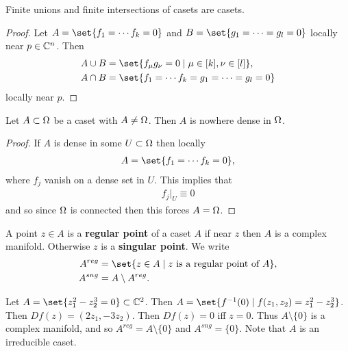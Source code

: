 \begin{proposition}
    Finite unions and finite intersections of casets are casets.
\end{proposition}

\begin{proof}
    Let $A = \set{ f_1 = \cdots f_k = 0}$ and $B = \set{g_1 = \cdots = g_l = 0}$ locally near $p \in \mathbb{C}^n$. Then
    \begin{align*}
        A \cup B &= \set{ f_\mu g_\nu = 0 \mid \mu \in [k], \nu \in [l]},\\
        A \cap B &= \set{f_1 = \cdots f_k = g_1 = \cdots = g_l = 0}
    \end{align*}
    locally near $p$.
\end{proof}


\begin{proposition}
    Let $A \subset \Omega$ be a caset with $A \neq \Omega$. Then $A$ is nowhere dense in $\Omega$.
\end{proposition}

\begin{proof}
    If $A$ is dense in some $U \subset \Omega$ then locally
    \begin{align*}
        A = \set{f_1 = \cdots f_k = 0},
    \end{align*}
    where $f_j$ vanish on a dense set in $U$. This implies that
    \begin{align*}
        f_j |_{U} \equiv 0
    \end{align*}
    and so since $\Omega$ is connected then this forces $A = \Omega$.
\end{proof}

\begin{definition}
    A point $z \in A$ is a \textbf{regular point} of a caset $A$ if near $z$ then $A$ is a complex manifold. Otherwise $z$ is a \textbf{singular point}. We write
    \begin{align*}
        A^{reg} &= \set{ z \in A \mid z \text{ is a regular point of } A},\\
        A^{sng } &= A \setminus A^{reg}.
    \end{align*}
\end{definition}

\begin{example}
    Let $A = \set{ z_1^2 - z_2^3 = 0} \subset \C^2$. Then $A = \set{ f^{-1}(0) \mid f(z_1, z_2 ) = z_1^2 - z_2^3 }$. Then $Df(z) = (2z_1 , -3z_2)$. Then $Df(z) = 0$ iff $z = 0$. Thus $A \setminus \{ 0 \}$ is a complex manifold, and so $A^{reg}= A \setminus \{ 0 \}$ and $A^{sng} = \{ 0 \}$. Note that $A$ is an irreducible caset.
\end{example}

